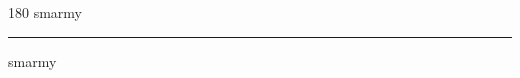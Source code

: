 
\begin{frame}
\begin{center}
\begin{turn}{180}
{\fontsize{2.5cm}{1em}\selectfont smarmy}
\end{turn}
\vspace{1em}\par  
\hrule
\vspace{1em}\par  
{\fontsize{2.5cm}{1em}\selectfont smarmy}
\end{center}
\end{frame}
